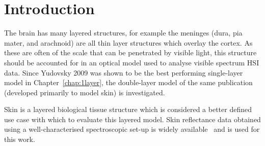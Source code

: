 
\section{Introduction}\label{sec:intro2}
The brain has many layered structures, for example the meninges (dura, pia mater, and arachnoid) are all thin layer structures which overlay the cortex. As these are often of the scale that can be penetrated by visible light, this structure should be accounted for in an optical model used to analyse visible spectrum HSI data. Since Yudovsky 2009 was shown to be the best performing single-layer model in Chapter~\ref{chap:1layer}, the double-layer model of the same publication~\citep{Yudovsky2009} (developed primarily to model skin) is investigated. 

Skin is a layered biological tissue structure which is considered a better defined use case with which to evaluate this layered model. Skin reflectance data obtained using a well-characterised spectroscopic set-up is widely available~\citep{Cooksey2017} and is used for this work. 



